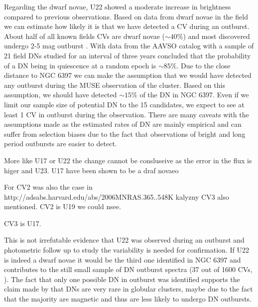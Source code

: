  Regarding the dwarf novae, U22 showed a moderate increase in brightness compared to previous observations. Based on data from dwarf novae in the field we can estimate how likely it is that we have detected a CV during an outburst. About half of all known fields CVs are dwarf novae ($\sim 40 \%$) and most discovered undergo 2-5 mag outburst \citep{2001PASP..113..764D,warner_cataclysmic_2003}. With data from the AAVSO catalog with a sample of 21 field DNs studied for an interval of three years \cite{Szkody_21DN_1984} concluded that the probability of a DN being in quiescence at a random epoch is $\sim 85 \%$. Due to the close distance to NGC 6397 we can make the assumption that we would have detected any outburst during the MUSE observation of the cluster. Based on this assumption, we should have detected $\sim 15 \%$ of the DN in NGC 6397. Even if we limit our sample size of potential DN to the 15 candidates, we expect to see at least 1 CV in outburst during the observation. There are many caveats with the assumptions made as the estimated rates of DN are mainly empirical and can suffer from selection biases due to the fact that observations of bright and long period outbursts are easier to detect. 



More like U17 or U22 the change cannot be consluseive as the error in the flux is higer and U23. U17 have been shown to be a draf novaeo

For CV2 was also the case in http://adsabs.harvard.edu/abs/2006MNRAS.365..548K kalyzny CV3 also mentioned. CV2 is U19 we could nsee. 

CV3 is U17.  

This is not irrefutable evidence that U22 was observed during an outburst and photometric follow up to study the variability is needed for confirmation. If U22 is indeed a dwarf novae it would be the third one identified in NGC 6397 \citep{shara_erupting_2005} and contributes to the still small sample of DN outburst spectra (37 out of 1600 CVs, \citealt{2001PASP..113..764D}). The fact that only one possible DN in outburst was identified supports the claim made by \cite{shara_CVsDN_1996} that DNs are very rare in globular clusters, maybe due to the fact that the majority are magnetic and thus are less likely to undergo DN outbursts. \\ 


